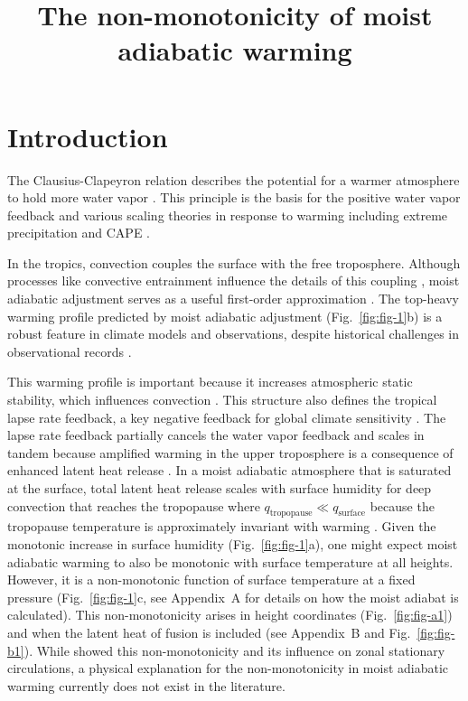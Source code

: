 \documentclass[draft]{ametsocV6.1}
\title{The non-monotonicity of moist adiabatic warming}
\affiliation{\aff{a}{Department of Geosciences, Union College, Schenectady New York, USA}}
\begin{document}
\maketitle

%
\section{Introduction}

The Clausius-Clapeyron relation describes the potential for a warmer atmosphere to hold more water vapor \citep{emanuel1994}. This principle is the basis for the positive water vapor feedback \citep{held2000a} and various scaling theories in response to warming including extreme precipitation \citep{oGorman2015} and CAPE \citep{romps2016}. 

In the tropics, convection couples the surface with the free troposphere. Although processes like convective entrainment influence the details of this coupling \citep{miyawaki2020}, moist adiabatic adjustment serves as a useful first-order approximation \citep{held1993}. The top-heavy warming profile predicted by moist adiabatic adjustment (Fig.~\ref{fig:fig-1}b) is a robust feature in climate models and observations, despite historical challenges in observational records \citep{vallis2015, santer2005}.

This warming profile is important because it increases atmospheric static stability, which influences convection \citep{neelin1987}. This structure also defines the tropical lapse rate feedback, a key negative feedback for global climate sensitivity \citep{hansen1984}. The lapse rate feedback partially cancels the water vapor feedback and scales in tandem because amplified warming in the upper troposphere is a consequence of enhanced latent heat release \citep{held2012}. In a moist adiabatic atmosphere that is saturated at the surface, total latent heat release scales with surface humidity for deep convection that reaches the tropopause where $q_\text{tropopause}\ll q_\text{surface}$ because the tropopause temperature is approximately invariant with warming \citep{seeley2019}. Given the monotonic increase in surface humidity (Fig.~\ref{fig:fig-1}a), one might expect moist adiabatic warming to also be monotonic with surface temperature at all heights. However, it is a non-monotonic function of surface temperature at a fixed pressure (Fig.~\ref{fig:fig-1}c, see Appendix~A for details on how the moist adiabat is calculated). This non-monotonicity arises in height coordinates (Fig.~\ref{fig:fig-a1}) and when the latent heat of fusion is included (see Appendix~B and Fig.~\ref{fig:fig-b1}). While \citet{levine2016} showed this non-monotonicity and its influence on zonal stationary circulations, a physical explanation for the non-monotonicity in moist adiabatic warming currently does not exist in the literature.
\end{document}
